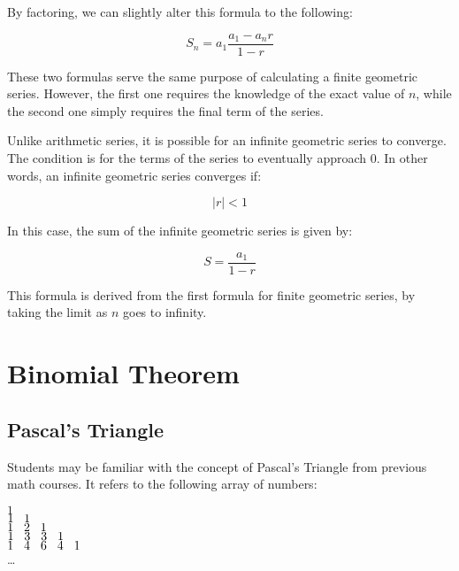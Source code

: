 \documentclass[11pt]{article}
\begin{document}
By factoring, we can slightly alter this formula to the following:

\[ S_n = a_1 \frac{a_1-a_nr}{1-r} \]

These two formulas serve the same purpose of calculating a finite geometric series. However, the first one requires the knowledge of the exact value of $n$, while the second one simply requires the final term of the series.

Unlike arithmetic series, it is possible for an infinite geometric series to converge. The condition is for the terms of the series to eventually approach $0$. In other words, an infinite geometric series converges if:

\[ |r| < 1 \]

In this case, the sum of the infinite geometric series is given by:

\[ S = \frac{a_1}{1-r} \]

This formula is derived from the first formula for finite geometric series, by taking the limit as $n$ goes to infinity.


\section{Binomial Theorem}

\subsection{Pascal's Triangle}
Students may be familiar with the concept of Pascal's Triangle from previous math courses. It refers to the following array of numbers:

\begin{center}
$1$\\
$1\hspace{0.3 cm}1$\\
$1\hspace{0.3 cm}2\hspace{0.3 cm}1$\\
$1\hspace{0.3 cm}3\hspace{0.3 cm}3\hspace{0.3 cm}1$\\
$1\hspace{0.3 cm}4\hspace{0.3 cm}6\hspace{0.3 cm}4\hspace{0.3 cm}1$\\
\dots
\end{center}
\end{document}
